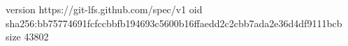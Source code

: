 version https://git-lfs.github.com/spec/v1
oid sha256:bb75774691fcfccbbfb194693c5600b16ffaedd2c2cbb7ada2e36d4df9111bcb
size 43802
